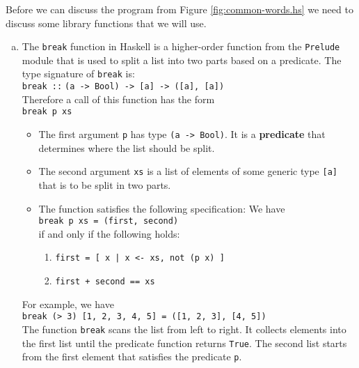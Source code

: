 \noindent
Before we can discuss the program from Figure \ref{fig:common-words.hs} we need to discuss some library
functions that we will use.
\begin{enumerate}[(a)]  
\item The \texttt{break} function in Haskell is a higher-order function from the \texttt{Prelude} module that
      is used to split a list into two parts based on a predicate. 
      The type signature of \texttt{break} is:
      \\[0.2cm]
      \hspace*{1.3cm}
      \texttt{break ::$\;$(a -> Bool) -> [a] -> ([a], [a])}
      \\[0.2cm]
      Therefore a call of this function has the form
      \\[0.2cm]
      \hspace*{1.3cm}
      \texttt{break p xs}
      \begin{itemize}
      \item The first argument \texttt{p} has type \texttt{(a -> Bool)}.  It is a \textbf{predicate} that
            determines where the list should be split. 
      \item The second argument \texttt{xs} is a list of elements of some generic type \texttt{[a]} that is to
            be split in two parts.
      \item The function satisfies the following specification: We have
            \\[0.2cm]
            \hspace*{1.3cm}
            \texttt{break p xs = (first, second)}
            \\[0.2cm]
            if and only if the following holds:
            \begin{enumerate}
            \item \texttt{first = [ x | x <- xs, not (p x) ]}
            \item \texttt{first + second == xs}
            \end{enumerate}
    \end{itemize}
    For example, we have
    \\[0.2cm]
    \hspace*{1.3cm}
    \texttt{break (> 3) [1, 2, 3, 4, 5] = ([1, 2, 3], [4, 5])}
    \\[0.2cm]
    The function \texttt{break} scans the list from left to right.  It collects elements into the first list
    until the predicate function returns \texttt{True}.  The second list starts from the first element that
    satisfies the predicate \texttt{p}.


\end{enumerate}
